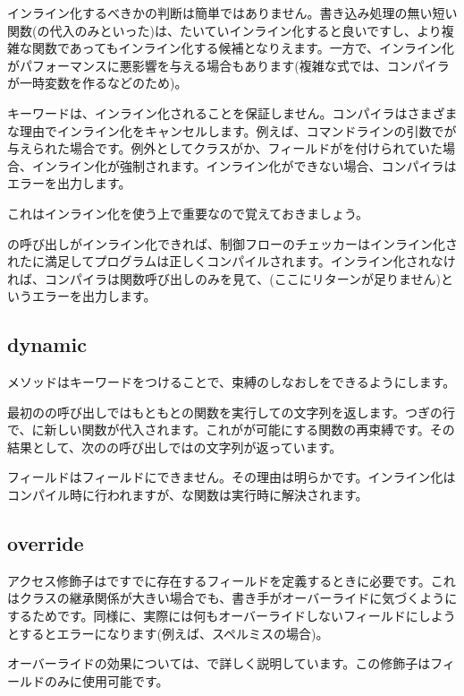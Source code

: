 インライン化するべきかの判断は簡単ではありません。書き込み処理の無い短い関数(\expr{=}の代入のみといった)は、たいていインライン化すると良いですし、より複雑な関数であってもインライン化する候補となりえます。一方で、インライン化がパフォーマンスに悪影響を与える場合もあります(複雑な式では、コンパイラが一時変数を作るなどのため)。

キーワードは、インライン化されることを保証しません。コンパイラはさまざまな理由でインライン化をキャンセルします。例えば、コマンドラインの引数でが与えられた場合です。例外としてクラスがか、フィールドがを付けられていた場合、インライン化が強制されます。インライン化ができない場合、コンパイラはエラーを出力します。

これはインライン化を使う上で重要なので覚えておきましょう。


の呼び出しがインライン化できれば、制御フローのチェッカーはインライン化されたに満足してプログラムは正しくコンパイルされます。インライン化されなければ、コンパイラは関数呼び出しのみを見て、(ここにリターンが足りません)というエラーを出力します。

\subsection{dynamic}
\label{class-field-dynamic}

メソッドはキーワードをつけることで、束縛のしなおしをできるようにします。


最初のの呼び出しではもともとの関数を実行しての文字列を返します。つぎの行で、に新しい関数が代入されます。これがが可能にする関数の再束縛です。その結果として、次のの呼び出しではの文字列が返っています。

フィールドはフィールドにできません。その理由は明らかです。インライン化はコンパイル時に行われますが、な関数は実行時に解決されます。


\subsection{override}
\label{class-field-override}

アクセス修飾子はですでに存在するフィールドを定義するときに必要です。これはクラスの継承関係が大きい場合でも、書き手がオーバーライドに気づくようにするためです。同様に、実際には何もオーバーライドしないフィールドにしようとするとエラーになります(例えば、スペルミスの場合)。

オーバーライドの効果については、で詳しく説明しています。この修飾子はフィールドのみに使用可能です。
